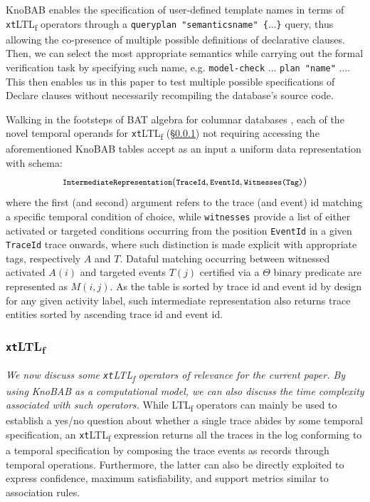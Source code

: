 \documentclass[sigconf]{acmart}
\begin{document}

KnoBAB enables the specification of user-defined template names in terms of \texttt{xt}LTL\textsubscript{f} operators through a {\color{oceanboatblue}\texttt{queryplan "semanticsname" \{}...\texttt{\}}} query, thus allowing the co-presence of multiple possible definitions of declarative clauses. Then, we can select the most appropriate semantics while carrying out the formal verification task by specifying such name, e.g. {\color{oceanboatblue}\texttt{model-check} ... \texttt{plan "name"} ...}. This then enables us in this paper to test multiple possible specifications of Declare clauses without necessarily recompiling the database's source code.


Walking in the footsteps of BAT algebra for columnar databases \cite{IdreosGNMMK12}, each of the novel temporal operands for \texttt{xt}LTL\textsubscript{f} (\S\ref{xtltlf}) not requiring accessing the aforementioned KnoBAB tables accept as an input a uniform data representation with schema: \[\footnotesize \texttt{IntermediateRepresentation}(\texttt{TraceId},\texttt{EventId},\texttt{Witnesses(Tag)})\] where the first (and second) argument refers to the trace (and event) id matching a specific temporal condition of choice, while \texttt{witnesses} provide a list of either  activated or targeted conditions occurring from the position \texttt{EventId} in a given \texttt{TraceId} trace onwards, where such distinction is made explicit with appropriate tags, respectively $A$ and $T$. Dataful matching occurring between witnessed activated $A(i)$ and targeted events $T(j)$ certified via a $\Theta$ binary predicate are represented as $M(i,j)$. As the table is sorted by trace id and event id by design for any given activity label, such intermediate representation  also returns  trace entities sorted by ascending trace id and event id.
\bigskip

\subsubsection{\texttt{xt}LTL\textsubscript{f}}\label{xtltlf}
\textit{We now discuss some \texttt{xt}LTL\textsubscript{f} operators of relevance for the current paper. By using KnoBAB as a computational model, we can also discuss the time complexity associated with such operators.} While LTL\textsubscript{f} operators can mainly be used to establish a yes/no question about whether a single trace abides by some temporal specification, an \texttt{xt}LTL\textsubscript{f} expression returns all the traces in the log conforming to a temporal specification by composing the trace events as records through temporal operations. Furthermore, the latter can also be directly exploited to express confidence, maximum satisfiability, and support metrics similar to association rules. 
\end{document}
